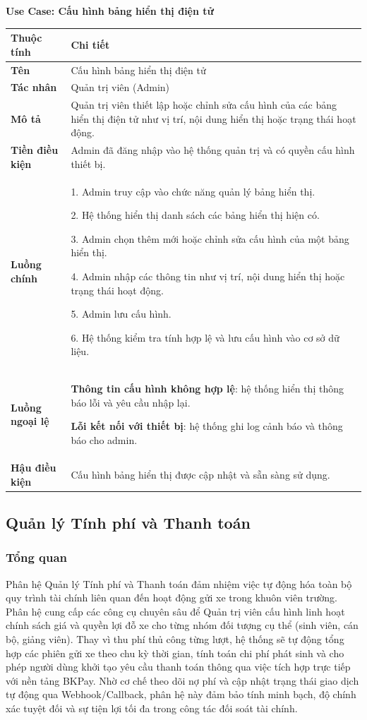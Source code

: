 \noindent \textbf{Use Case: Cấu hình bảng hiển thị điện tử} \\
\renewcommand{\arraystretch}{1.6}
\begin{xltabular}{\textwidth}{|l|X|}
\hline
\textbf{Thuộc tính} & \textbf{Chi tiết} \\
\hline
\textbf{Tên} & Cấu hình bảng hiển thị điện tử  \\
\hline
\textbf{Tác nhân} & Quản trị viên (Admin) \\
\hline
\textbf{Mô tả} & Quản trị viên thiết lập hoặc chỉnh sửa cấu hình của các bảng hiển thị điện tử như vị trí, nội dung hiển thị hoặc trạng thái hoạt động. \\
\hline
\textbf{Tiền điều kiện} & Admin đã đăng nhập vào hệ thống quản trị và có quyền cấu hình thiết bị. \\
\hline
\textbf{Luồng chính} & 
1. Admin truy cập vào chức năng quản lý bảng hiển thị. 

2. Hệ thống hiển thị danh sách các bảng hiển thị hiện có. 

3. Admin chọn thêm mới hoặc chỉnh sửa cấu hình của một bảng hiển thị. 

4. Admin nhập các thông tin như vị trí, nội dung hiển thị hoặc trạng thái hoạt động. 

5. Admin lưu cấu hình. 

6. Hệ thống kiểm tra tính hợp lệ và lưu cấu hình vào cơ sở dữ liệu.
\\
\hline

\textbf{Luồng ngoại lệ} & 
\textbf{Thông tin cấu hình không hợp lệ}: hệ thống hiển thị thông báo lỗi và yêu cầu nhập lại. 

\textbf{Lỗi kết nối với thiết bị}: hệ thống ghi log cảnh báo và thông báo cho admin.
\\
\hline

\textbf{Hậu điều kiện} & Cấu hình bảng hiển thị được cập nhật và sẵn sàng sử dụng.\\
\hline
\end{xltabular}

\newpage
\subsection{Quản lý Tính phí và Thanh toán}
\subsubsection{Tổng quan}
Phân hệ Quản lý Tính phí và Thanh toán đảm nhiệm việc tự động hóa toàn bộ quy trình tài chính liên quan đến hoạt động gửi xe trong khuôn viên trường. Phân hệ cung cấp các công cụ chuyên sâu để Quản trị viên cấu hình linh hoạt chính sách giá và quyền lợi đỗ xe cho từng nhóm đối tượng cụ thể (sinh viên, cán bộ, giảng viên). Thay vì thu phí thủ công từng lượt, hệ thống sẽ tự động tổng hợp các phiên gửi xe theo chu kỳ thời gian, tính toán chi phí phát sinh và cho phép người dùng khởi tạo yêu cầu thanh toán thông qua việc tích hợp trực tiếp với nền tảng BKPay. Nhờ cơ chế theo dõi nợ phí và cập nhật trạng thái giao dịch tự động qua Webhook/Callback, phân hệ này đảm bảo tính minh bạch, độ chính xác tuyệt đối và sự tiện lợi tối đa trong công tác đối soát tài chính.

